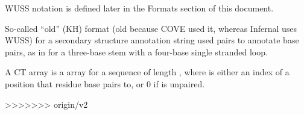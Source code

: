 WUSS notation is defined later in the Formats section of this
document.

So-called ``old'' (KH) format (old because COVE used it, whereas
Infernal uses WUSS) for a secondary structure annotation string used
\ccode{><} pairs to annotate base pairs, as in  for
a three-base stem with a four-base single stranded loop.

A CT array is a  array for a sequence of length ,
where  is either an index  of a position
that residue  base pairs to, or 0 if  is unpaired.








>>>>>>> origin/v2
